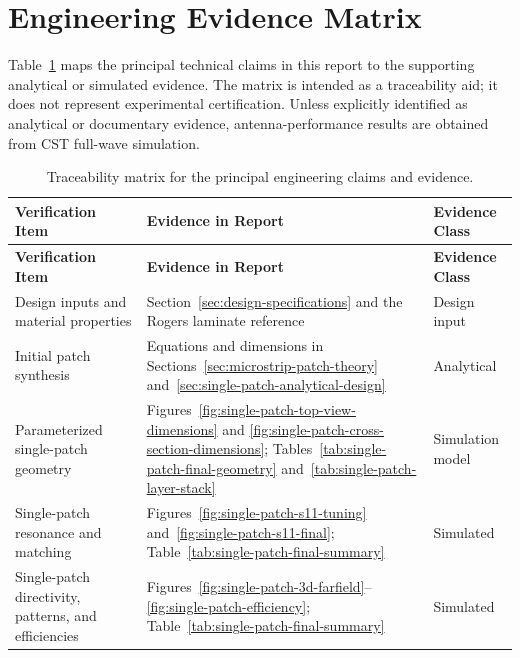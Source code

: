 \section{Engineering Evidence Matrix}
\label{sec:engineering-evidence}

Table~\ref{tab:engineering-evidence} maps the principal technical claims in this report to the
supporting analytical or simulated evidence. The matrix is intended as a traceability aid; it does
not represent experimental certification. Unless explicitly identified as analytical or documentary
evidence, antenna-performance results are obtained from CST full-wave simulation.

\begin{longtable}{@{}
>{\raggedright\arraybackslash}p{}
>{\raggedright\arraybackslash}p{}
>{\raggedright\arraybackslash}p{}
@{}}
\caption{Traceability matrix for the principal engineering claims and evidence.}
\label{tab:engineering-evidence}\\
\toprule
\textbf{Verification Item} & \textbf{Evidence in Report} & \textbf{Evidence Class} \\
\midrule
\endfirsthead
\toprule
\textbf{Verification Item} & \textbf{Evidence in Report} & \textbf{Evidence Class} \\
\midrule
\endhead

Design inputs and material properties &
Section~\ref{sec:design-specifications} and the Rogers laminate reference &
Design input \\

Initial patch synthesis &
Equations and dimensions in Sections~\ref{sec:microstrip-patch-theory}
and~\ref{sec:single-patch-analytical-design} &
Analytical \\

Parameterized single-patch geometry &
Figures~\ref{fig:single-patch-top-view-dimensions} and
\ref{fig:single-patch-cross-section-dimensions}; Tables~\ref{tab:single-patch-final-geometry}
and~\ref{tab:single-patch-layer-stack} &
Simulation model \\

Single-patch resonance and matching &
Figures~\ref{fig:single-patch-s11-tuning} and~\ref{fig:single-patch-s11-final};
Table~\ref{tab:single-patch-final-summary} &
Simulated \\

Single-patch directivity, patterns, and efficiencies &
Figures~\ref{fig:single-patch-3d-farfield}--\ref{fig:single-patch-efficiency};
Table~\ref{tab:single-patch-final-summary} &
Simulated \\


\end{longtable}
